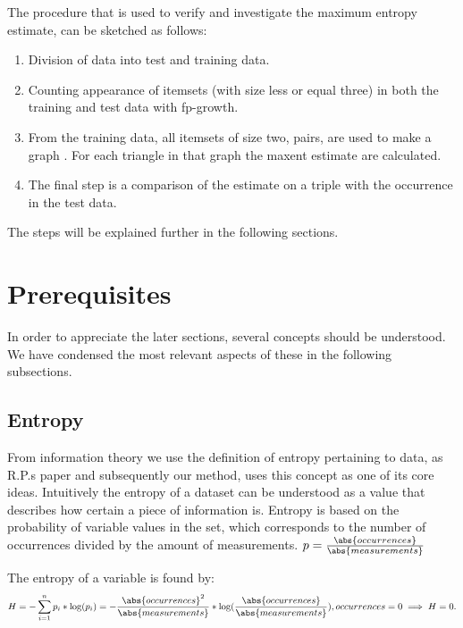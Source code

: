 \documentclass{acm_proc_article-sp}
\begin{document}
The procedure that is used to verify and investigate the maximum entropy estimate, can be sketched as follows:

\begin{enumerate}
  \item Division of data into test and training data. 
  \item Counting appearance of itemsets (with size less or equal three) in both the training and test data with fp-growth.
  \item From the training data, all  itemsets of size two, pairs, are used to make a graph . For each triangle in that graph the maxent estimate are calculated. 
  \item The final step is a comparison of the estimate on a triple with the occurrence in the test data. 
\end{enumerate}

The steps will be explained further in the following sections.

\section{Prerequisites}

In order to appreciate the later sections, several concepts should be understood.
We have condensed the most relevant aspects of these in the following subsections.

\subsection{Entropy}

From information theory we use the definition of entropy pertaining to data, as R.P.s paper and subsequently our method, uses this concept as one of its core ideas. Intuitively the entropy of a dataset can be understood as a value that describes how certain a piece of information is. Entropy is based on the probability of variable values in the set, which corresponds to the number of occurrences divided by the amount of measurements. $p = \tfrac{\abs{occurrences}}{\abs{measurements}}$ 

The entropy of a variable is found by:
\begin{equation}
H = - \sum\limits_{i=1}^n p_{i} * \log (p_{i}) = - \frac{\abs{occurrences}^2}{\abs{measurements}} * \log(\frac{\abs{occurrences}}{\abs{measurements}}) 
$\\ $
, occurrences=0 \implies H=0.
\end{equation}
\end{document}
